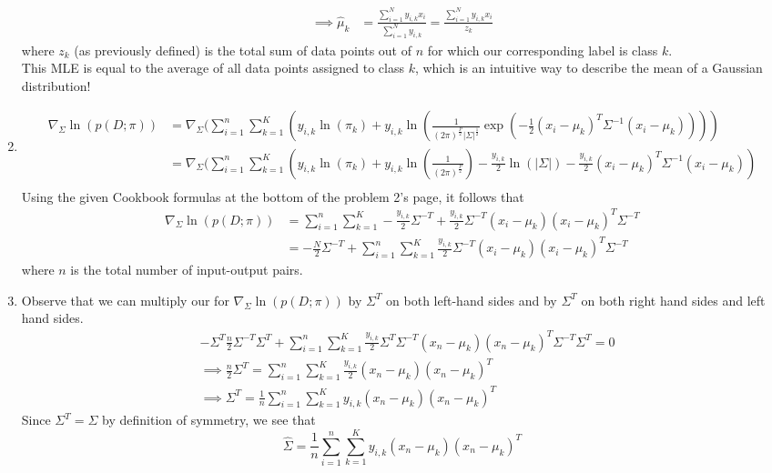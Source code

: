 \documentclass[submit]{harvardml}
\begin{document}
\begin{enumerate}
\begin{align}
         \implies \hat\mu_k &= \frac{\sum_{i=1}^N y_{i,k}x_i}{\sum_{i=1}^N y_{i,k}} =  \frac{\sum_{i=1}^N y_{i,k}x_i}{z_k}
     \end{align}
     where $z_k$ (as previously defined) is the total sum of data points out of $n$ for which our corresponding label is class $k$. \\
     This MLE is equal to the average of all data points assigned to class $k$, which is an intuitive way to describe the mean of a Gaussian distribution!
     \item 
     \begin{align}
         \nabla_{\Sigma}\ln(p(D;\pi)) &= \nabla_{\Sigma}(\sum_{i=1}^n \sum_{k=1}^K (y_{i,k}\ln(\pi_k) + y_{i,k}\ln(\frac{1}{(2\pi)^{\frac{P}{2}}|\Sigma|^\frac{1}{2}}\exp(-\frac{1}{2}(x_i- \mu_k)^T\Sigma^{-1}(x_i-\mu_k)))) \\
         &= \nabla_{\Sigma}(\sum_{i=1}^n \sum_{k=1}^K (y_{i,k}\ln(\pi_k) + y_{i,k}\ln(\frac{1}{(2\pi)^{\frac{P}{2}}})- \frac{y_{i,k}}{2}\ln(|\Sigma|) - \frac{y_{i,k}}{2}(x_i- \mu_k)^T\Sigma^{-1}(x_i-\mu_k)) \\
     \end{align}
     Using the given Cookbook formulas at the bottom of the problem 2's page, it follows that 
     \begin{align}
         \nabla_{\Sigma}\ln(p(D;\pi)) &= \sum_{i=1}^n \sum_{k=1}^K -\frac{y_{i,k}}{2}\Sigma^{-T} + \frac{y_{i,k}}{2}\Sigma^{-T}(x_i-\mu_k)(x_i-\mu_k)^T\Sigma^{-T} \\
         &= -\frac{N}{2} \Sigma^{-T} + \sum_{i=1}^n \sum_{k=1}^K \frac{y_{i,k}}{2}\Sigma^{-T}(x_i-\mu_k)(x_i-\mu_k)^T\Sigma^{-T}
     \end{align}
     where $n$ is the total number of input-output pairs.
     \item Observe that we can multiply our for $\nabla_{\Sigma}\ln(p(D;\pi))$ by $\Sigma^T$ on both left-hand sides and by $\Sigma^T$ on both right hand sides and left hand sides. 
     \begin{align}
         &-\Sigma^T \frac{n}{2} \Sigma^{-T} \Sigma^T + \sum_{i=1}^n \sum_{k=1}^K \frac{y_{i,k}}{2}\Sigma^T\Sigma^{-T}(x_n - \mu_k)(x_n-\mu_k)^T\Sigma^{-T}\Sigma^T = 0 \\
         &\implies \frac{n}{2} \Sigma^T = \sum_{i=1}^n \sum_{k=1}^K \frac{y_{i,k}}{2}(x_n - \mu_k)(x_n-\mu_k)^T \\
        &\implies \Sigma^T = \frac{1}{n} \sum_{i=1}^n \sum_{k=1}^K y_{i,k}(x_n - \mu_k)(x_n-\mu_k)^T
     \end{align}
     Since $\Sigma^T = \Sigma$ by definition of symmetry, we see that
     $$\hat\Sigma = \frac{1}{n} \sum_{i=1}^n \sum_{k=1}^K y_{i,k}(x_n - \mu_k)(x_n-\mu_k)^T$$
\end{enumerate}
\end{document}
